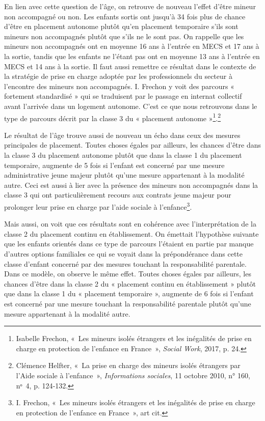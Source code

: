 \documentclass[
  12,
  a4paper,
]{report}
\begin{document}
En lien avec cette question de l'âge, on retrouve de nouveau l'effet
d'être mineur non accompagné ou non. Les enfants sortis ont jusqu'à 34
fois plus de chance d'être en placement autonome plutôt qu'en placement
temporaire s'ils sont mineurs non accompagnés plutôt que s'ils ne le
sont pas. On rappelle que les mineurs non accompagnés ont en moyenne 16
ans à l'entrée en MECS et 17 ans à la sortie, tandis que les enfants ne
l'étant pas ont en moyenne 13 ans à l'entrée en MECS et 14 ans à la
sortie. Il faut aussi remettre ce résultat dans le contexte de la
stratégie de prise en charge adoptée par les professionnels du secteur à
l'encontre des mineurs non accompagnés. I. Frechon y voit des parcours «
fortement standardisé » qui se traduisent par le passage en internat
collectif avant l'arrivée dans un logement autonome. C'est ce que nous
retrouvons dans le type de parcours décrit par la classe 3 du «
placement autonome »\footnote{Isabelle Frechon, {«~Les mineurs isolés
  étrangers et les inégalités de prise en charge en protection de
  l'enfance en France~»}, \emph{Social Work}, 2017, p. 24.}.\footnote{Clémence
  Helfter, {«~La prise en charge des mineurs isolés étrangers par l'Aide
  sociale à l'enfance~»}, \emph{Informations sociales}, 11 octobre 2010,
  n° 160, nᵒ~4, p. 124‑132.}

Le résultat de l'âge trouve aussi de nouveau un écho dans ceux des
mesures principales de placement. Toutes choses égales par ailleurs, les
chances d'être dans la classe 3 du placement autonome plutôt que dans la
classe 1 du placement temporaire, augmente de 5 fois si l'enfant est
concerné par une mesure administrative jeune majeur plutôt qu'une mesure
appartenant à la modalité autre. Ceci est aussi à lier avec la présence
des mineurs non accompagnés dans la classe 3 qui ont particulièrement
recours aux contrats jeune majeur pour prolonger leur prise en charge
par l'aide sociale à l'enfance\footnote{I. Frechon, {«~Les mineurs
  isolés étrangers et les inégalités de prise en charge en protection de
  l'enfance en France~»}, art cit.}.

Mais aussi, on voit que ces résultats sont en cohérence avec
l'interprétation de la classe 2 du placement continu en établissement.
On émettait l'hypothèse suivante que les enfants orientés dans ce type
de parcours l'étaient en partie par manque d'autres options familiales
ce qui se voyait dans la prépondérance dans cette classe d'enfant
concerné par des mesures touchant la responsabilité parentale. Dans ce
modèle, on observe le même effet. Toutes choses égales par ailleurs, les
chances d'être dans la classe 2 du « placement continu en établissement
» plutôt que dans la classe 1 du « placement temporaire », augmente de 6
fois si l'enfant est concerné par une mesure touchant la responsabilité
parentale plutôt qu'une mesure appartenant à la modalité autre.
\end{document}
